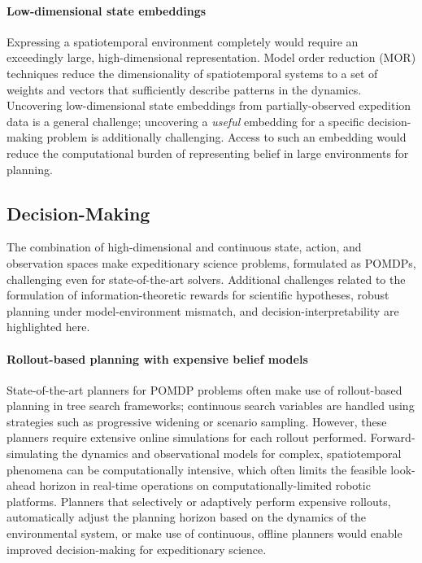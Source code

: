 \paragraph{Low-dimensional state embeddings}
Expressing a spatiotemporal environment completely would require an exceedingly large, high-dimensional representation. Model order reduction (MOR) techniques reduce the dimensionality of spatiotemporal systems to a set of weights and vectors that sufficiently describe patterns in the dynamics. Uncovering low-dimensional state embeddings from partially-observed expedition data is a general challenge\autocite{spantini2018inference}; uncovering a \emph{useful} embedding for a specific decision-making problem is additionally challenging\autocite{pacelli2019task}. Access to such an embedding would reduce the computational burden of representing belief in large environments for planning.


\subsection{Decision-Making}
The combination of high-dimensional and continuous state, action, and observation spaces make expeditionary science problems, formulated as POMDPs, challenging even for state-of-the-art solvers. Additional challenges related to the formulation of information-theoretic rewards for scientific hypotheses, robust planning under model-environment mismatch, and decision-interpretability are highlighted here.

\paragraph{Rollout-based planning with expensive belief models}
State-of-the-art planners for POMDP problems often make use of rollout-based planning in tree search frameworks; continuous search variables are handled using strategies such as progressive widening or scenario sampling\autocite{sunberg2018online}. However, these planners require extensive online simulations for each rollout performed. Forward-simulating the dynamics and observational models for complex, spatiotemporal phenomena can be computationally intensive, which often limits the feasible look-ahead horizon in real-time operations on computationally-limited robotic platforms.  Planners that selectively or adaptively perform expensive rollouts, automatically adjust the planning horizon based on the dynamics of the environmental system, or make use of continuous, offline planners would enable improved decision-making for expeditionary science.

